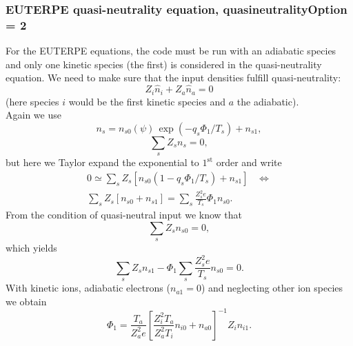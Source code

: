\documentclass[12pt]{article}
\begin{document}
\subsubsection*{EUTERPE quasi-neutrality equation, quasineutralityOption = 2}
For the EUTERPE equations, the code must be run with 
an adiabatic species and only one kinetic species (the first) is considered in the quasi-neutrality equation. 
We need to make sure that the input densities fulfill quasi-neutrality:
\begin{equation}
  \label{eq:QuasiNeutralityInputFull}
   Z_i \hat{n}_{i} + Z_a \hat{n}_{a} = 0
\end{equation}
(here species $i$ would be the first kinetic species and $a$ the adiabatic).\\
Again we use 
\begin{equation}
n_s = n_{s 0} \left(\psi\right) \, \exp \left(- q_s \Phi_1 / T_s \right) + n_{s 1},
\label{eq:DensityParts2}
\end{equation}
\begin{equation}
\sum_s Z_s n_s = 0,
\label{eq:Quasineutrality2}
\end{equation}
but here we Taylor expand the exponential to $1^{\mathrm{st}}$ order and write
\begin{multline}
\label{eq:QuasineutralityExpanded}
0 \simeq \sum_s Z_s \left[n_{s 0} \left(1 - q_s \Phi_1 / T_s \right) + n_{s 1}\right] \;\;\; \Leftrightarrow \\
\sum_s Z_s \left[n_{s 0} + n_{s 1}\right] = \sum_s \frac{Z_s^2 e}{T_s} \Phi_1 n_{s 0} .
\end{multline}
From the condition of quasi-neutral input we know that
\[
\sum_s Z_s n_{s 0} = 0,
\]
which yields 
\begin{equation}
\sum_s Z_s n_{s 1} - \Phi_1 \sum_s \frac{Z_s^2 e}{T_s} n_{s 0}  = 0.
\label{eq:Quasineutrality2}
\end{equation}
With kinetic ions, adiabatic electrons ($n_{a 1} = 0$) and neglecting other ion species we obtain 
\begin{equation}
\Phi_1 = \frac{T_a}{Z_a^2 e} \left[\frac{Z_i^2 T_a}{Z_a^2 T_i} n_{i 0} + n_{a 0}\right]^{-1} Z_i n_{i 1}.
\label{eq:Phi1}
\end{equation}
%
\end{document}
